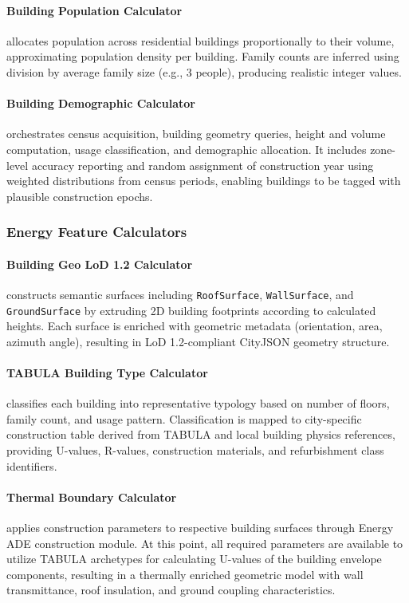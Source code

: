\paragraph{Building Population Calculator} allocates population across residential buildings proportionally to their volume, approximating population density per building. Family counts are inferred using division by average family size (e.g., 3 people), producing realistic integer values.

\paragraph{Building Demographic Calculator} orchestrates census acquisition, building geometry queries, height and volume computation, usage classification, and demographic allocation. It includes zone-level accuracy reporting and random assignment of construction year using weighted distributions from census periods, enabling buildings to be tagged with plausible construction epochs.

\subsubsection{Energy Feature Calculators}

\paragraph{Building Geo LoD 1.2 Calculator} constructs semantic surfaces including \texttt{RoofSurface}, \texttt{WallSurface}, and \texttt{GroundSurface} by extruding 2D building footprints according to calculated heights. Each surface is enriched with geometric metadata (orientation, area, azimuth angle), resulting in LoD 1.2-compliant CityJSON geometry structure.

\paragraph{TABULA Building Type Calculator} classifies each building into representative typology based on number of floors, family count, and usage pattern. Classification is mapped to city-specific construction table derived from TABULA and local building physics references, providing U-values, R-values, construction materials, and refurbishment class identifiers.

\paragraph{Thermal Boundary Calculator} applies construction parameters to respective building surfaces through Energy ADE construction module. At this point, all required parameters are available to utilize TABULA archetypes for calculating U-values of the building envelope components, resulting in a thermally enriched geometric model with wall transmittance, roof insulation, and ground coupling characteristics.

